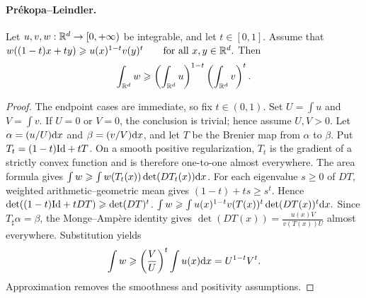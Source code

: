 \paragraph{Pr\'ekopa--Leindler.}
\begin{prop}\label{prop-ot-prekopa-leindler}
Let $u,v,w:\mathbb{R}^d\to[0,+\infty)$ be integrable, and let $t\in[0,1]$. Assume that
\(w((1-t)x+ty)\geqslant u(x)^{1-t}v(y)^t \qquad \text{for all }x,y\in\mathbb{R}^d.\)
Then
\[
\int_{\mathbb{R}^d} w
\geqslant
\left(\int_{\mathbb{R}^d}u\right)^{1-t}
\left(\int_{\mathbb{R}^d}v\right)^t.
\]
\end{prop}
\begin{proof}
The endpoint cases are immediate, so fix $t\in(0,1)$. Set $U=\int u$ and $V=\int v$. If $U=0$ or $V=0$, the conclusion is trivial; hence assume $U,V>0$. Let $\alpha=(u/U)\mathrm{d} x$ and $\beta=(v/V)\mathrm{d} x$, and let $T$ be the Brenier map from $\alpha$ to $\beta$. Put $T_t=(1-t)\mathrm{Id}+tT$. On a smooth positive regularization, $T_t$ is the gradient of a strictly convex function and is therefore one-to-one almost everywhere. The area formula gives
\(\int w \geqslant \int w(T_t(x))\det(DT_t(x))\mathrm{d} x\).
For each eigenvalue $s\geq0$ of $DT$, weighted arithmetic--geometric mean gives $(1-t)+ts\geq s^t$. Hence
\(\det((1-t)\mathrm{Id}+tDT)\geqslant\det(DT)^t\).
\(\int w \geqslant \int u(x)^{1-t}v(T(x))^t\det(DT(x))^t\mathrm{d} x.\)
Since $T_\sharp\alpha=\beta$, the Monge--Amp\`ere identity gives
\(\det(DT(x))=\frac{u(x)V}{v(T(x))U}\)
almost everywhere. Substitution yields
\[
\int w
\geqslant
\left(\frac{V}{U}\right)^t\int u(x)\mathrm{d} x
=
U^{1-t}V^t.
\]
Approximation removes the smoothness and positivity assumptions.
\end{proof}
